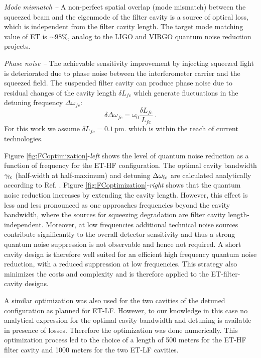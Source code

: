 \textit{Mode mismatch --} A non-perfect spatial overlap (mode mismatch) between the squeezed beam and the eigenmode of the filter cavity
 is a source of optical loss, which is independent from the filter cavity length. 
 The target mode matching value of ET is $\sim 98\%$, analog to the LIGO and VIRGO quantum noise reduction projects.

\textit{Phase noise --} The achievable sensitivity improvement by injecting squeezed light is deteriorated due to phase noise between the interferometer carrier and the squeezed field. The suspended filter cavity can produce phase noise due to residual changes of the cavity length $\delta L_{fc}$ which generate fluctuations in the detuning frequency $\Delta \omega_{fc}$:
%
%
  \begin{equation}
    \delta \Delta \omega_{fc}=\omega_0 \frac{\delta L_{fc}}{L_{fc}} \ .
  \end{equation}
For this work we assume $\delta L_{fc}=0.1$\,pm. which is  within the reach of current technologies.

Figure \ref{fig:FCoptimization}-{\it left} shows the level of quantum noise reduction as a function of frequency for the ET-HF configuration. %
The optimal cavity bandwidth $\gamma_{\rm fc}$ (half-width at half-maximum) and detuning $\Delta \omega_{\rm fc}$ are calculated analytically according to Ref. \cite{Kwee2014}. 
Figure \ref{fig:FCoptimization}-{\it right} shows that the quantum noise reduction increases by extending the cavity length. However, this effect is less and less pronounced as one approaches frequencies beyond the cavity bandwidth, where the sources for squeezing degradation are filter cavity length-independent. Moreover, at low frequencies additional technical noise sources contribute significantly to the overall detector sensitivity and thus a strong quantum noise suppression is not observable and hence not required. A short cavity design is therefore well suited for an efficient high frequency quantum noise reduction, with a reduced suppression at low frequencies. This strategy also minimizes the costs and complexity and is therefore applied to the ET-filter-cavity designs.

A similar optimization was also used for the two cavities of the detuned configuration as planned for ET-LF. However, to our knowledge in this case no analytical expression for the optimal cavity bandwidth and detuning is available in presence of losses. Therefore the optimization was done numerically. 
This optimization process led to the choice of a length of 500 meters for the ET-HF filter cavity and 1000 meters for the two ET-LF cavities.